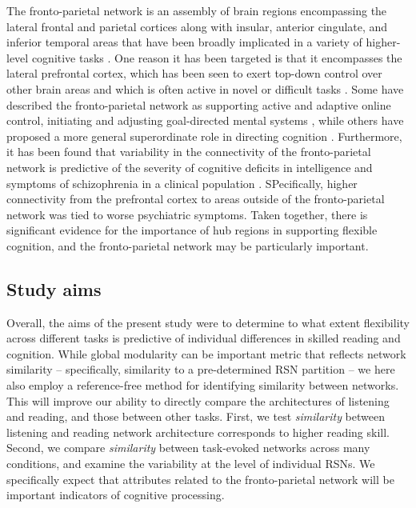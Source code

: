 The fronto-parietal network is an assembly of brain regions encompassing the lateral frontal and parietal cortices along with insular, anterior cingulate, and inferior temporal areas that have been broadly implicated in a variety of higher-level cognitive tasks \citep{Fedorenko2013}. One reason it has been targeted is that it encompasses the lateral prefrontal cortex, which has been seen to exert top-down control over other brain areas and which is often active in novel or difficult tasks \citep{Duncan2010}. Some have described the fronto-parietal network as supporting active and adaptive online control, initiating and adjusting goal-directed mental systems \citep{Dosenbach2007}, while others have proposed a more general superordinate role in directing cognition \citep{Niendam2012}.  Furthermore, it has been found that variability in the connectivity of the fronto-parietal network is predictive of the severity of cognitive deficits in intelligence and symptoms of schizophrenia in a clinical population \citep{Cole2011}. SPecifically, higher connectivity from the prefrontal cortex to areas outside of the fronto-parietal network was tied to worse psychiatric symptoms. Taken together, there is significant evidence for the importance of hub regions in supporting flexible cognition, and the fronto-parietal network may be particularly important. 

\subsection{Study aims}

Overall, the aims of the present study were to determine to what extent flexibility across different tasks is predictive of individual differences in skilled reading and cognition. While global modularity can be important metric that reflects network similarity -- specifically, similarity to a pre-determined RSN partition -- we here also employ a reference-free method for identifying similarity between networks. This will improve our ability to directly compare the architectures of listening and reading, and those between other tasks. First, we test \textit{similarity} between listening and reading network architecture corresponds to higher reading skill. Second, we compare \textit{similarity} between task-evoked networks across many conditions, and examine the variability at the level of individual RSNs. We specifically expect that attributes related to the fronto-parietal network will be important indicators of cognitive processing.  

